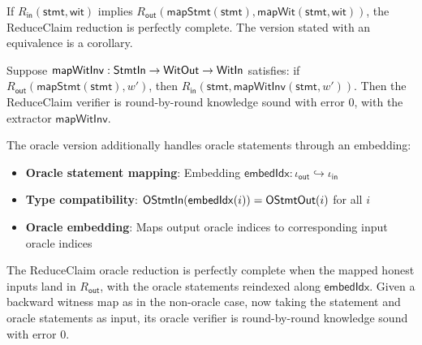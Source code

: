 \begin{theorem}
    If $R_{\mathsf{in}}(\mathsf{stmt}, \mathsf{wit})$ implies $R_{\mathsf{out}}(\mathsf{mapStmt}(\mathsf{stmt}), \mathsf{mapWit}(\mathsf{stmt}, \mathsf{wit}))$, the ReduceClaim reduction is perfectly complete. The version stated with an equivalence is a corollary.
    \leanok
\end{theorem}

\begin{theorem}
    Suppose $\mathsf{mapWitInv} : \mathsf{StmtIn} \to \mathsf{WitOut} \to \mathsf{WitIn}$ satisfies: if $R_{\mathsf{out}}(\mathsf{mapStmt}(\mathsf{stmt}), w')$, then $R_{\mathsf{in}}(\mathsf{stmt}, \mathsf{mapWitInv}(\mathsf{stmt}, w'))$. Then the ReduceClaim verifier is round-by-round knowledge sound with error $0$, with the extractor $\mathsf{mapWitInv}$.
    \leanok
\end{theorem}

\begin{definition}
    \label{def:reduceclaim_oracle_reduction}
    The oracle version additionally handles oracle statements through an embedding:
    \begin{itemize}
        \item \textbf{Oracle statement mapping}: Embedding $\mathsf{embedIdx} : \iota_{\mathsf{out}} \hookrightarrow \iota_{\mathsf{in}}$
        \item \textbf{Type compatibility}: $\mathsf{OStmtIn}(\mathsf{embedIdx}(i)) = \mathsf{OStmtOut}(i)$ for all $i$
        \item \textbf{Oracle embedding}: Maps output oracle indices to corresponding input oracle indices
    \end{itemize}
    \leanok
\end{definition}

\begin{theorem}
    The ReduceClaim oracle reduction is perfectly complete when the mapped honest inputs land in $R_{\mathsf{out}}$, with the oracle statements reindexed along $\mathsf{embedIdx}$. Given a backward witness map as in the non-oracle case, now taking the statement and oracle statements as input, its oracle verifier is round-by-round knowledge sound with error $0$.
    \leanok
\end{theorem}

